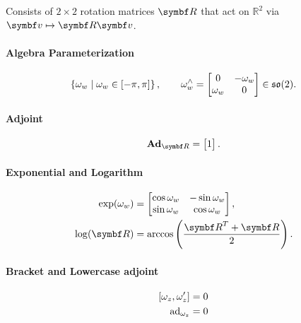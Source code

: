 \begin{properties}[breakable, title={$\SOtwo$ formula sheet}]
  Consists of $2 \times 2$ rotation matrices $\bR$ that act on $\mathbb{R}^{2}$ via $\bv \mapsto \bR \bv$.

  \paragraph{Algebra Parameterization}
  \begin{equation}
    \left\{ \omega_{w} \mid \omega_{w} \in [-\pi, \pi] \right\}, \qquad \omega_{w}^\wedge = \begin{bmatrix} 0 & -\omega_{w} \\ \omega_{w} & 0 \end{bmatrix} \in {\mathfrak{so}(2)}.
  \end{equation}

  \paragraph{Adjoint}
  \begin{equation}
    \bAd_{\bR} = \begin{bmatrix} 1 \end{bmatrix}.
  \end{equation}

  \paragraph{Exponential and Logarithm}
  \begin{subequations}
    \begin{align}
      \label{eq:so2_exp}
      \exp (\omega_w) & = \begin{bmatrix} \cos \omega_{w} & -\sin \omega_{w} \\ \sin \omega_{w} & \cos \omega_{w} \end{bmatrix},                   \\
      \label{eq:so2_log}
      \log (\bR)      & = \arccos \left(\frac{\bR^{T} + \bR}{2}\right).
    \end{align}
  \end{subequations}

  \paragraph{Bracket and Lowercase adjoint}
  \begin{subequations}
    \begin{align}
      \left[ \omega_{z}, \omega_{z}' \right ] & = 0 \\
      \operatorname{ad}_{\omega_z}                          & = 0
    \end{align}
  \end{subequations}


\end{properties}
